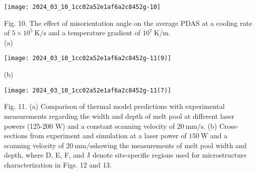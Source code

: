 \documentclass[10pt]{article}
\begin{document}
\begin{center}
\texttt{[image: 2024\_03\_10\_1cc02a52e1af6a2c8452g-10]}
\end{center}

Fig. 10. The effect of misorientation angle on the average PDAS at a cooling rate of $5 \times 10^{5} \mathrm{~K} / \mathrm{s}$ and a temperature gradient of $10^{7} \mathrm{~K} / \mathrm{m}$.\\
(a)

\begin{center}
\texttt{[image: 2024\_03\_10\_1cc02a52e1af6a2c8452g-11(9)]}
\end{center}

(b)

\begin{center}
\texttt{[image: 2024\_03\_10\_1cc02a52e1af6a2c8452g-11(7)]}
\end{center}

Fig. 11. (a) Comparison of thermal model predictions with experimental measurements regarding the width and depth of melt pool at different laser powers (125-200 W) and a constant scanning velocity of $20 \mathrm{~mm} / \mathrm{s}$. (b) Cross-sections from experiment and simulation at a laser power of $150 \mathrm{~W}$ and a scanning velocity of $20 \mathrm{~mm} / \mathrm{s} \mathrm{showing}$ the measurements of melt pool width and depth, where D, E, F, and J denote site-specific regions used for microstructure characterization in Figs. 12 and 13.
\end{document}
